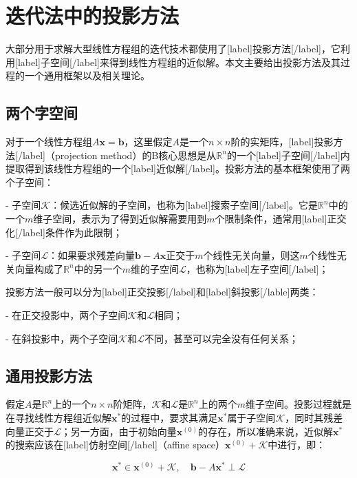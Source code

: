 \documentclass[UTF8,nofonts]{ctexart}
\begin{document}
\section*{迭代法中的投影方法}

大部分用于求解大型线性方程组的迭代技术都使用了[label]投影方法[/label]，它利用[label]子空间[/label]来得到线性方程组的近似解。本文主要给出投影方法及其过程的一个通用框架以及相关理论。

\subsection*{两个字空间}

对于一个线性方程组$A\boldsymbol{x}=\boldsymbol{b}$，这里假定$A$是一个$n \times n$阶的实矩阵，[label]投影方法[/label]（projection method）的B核心思想是从$\mathbb{R}^n$的一个[label]子空间[/label]内提取得到该线性方程组的一个[label]近似解[/label]。投影方法的基本框架使用了两个子空间：

- 子空间$\mathcal{K}$：候选近似解的子空间，也称为[label]搜索子空间[/label]。它是$\mathbb{R}^n$中的一个$m$维子空间，表示为了得到近似解需要用到$m$个限制条件，通常用[label]正交化[/label]条件作为此限制；

- 子空间$\mathcal{L}$：如果要求残差向量$\boldsymbol{b}-A\boldsymbol{x}$正交于$m$个线性无关向量，则这$m$个线性无关向量构成了$\mathbb{R}^n$中的另一个$m$维的子空间$\mathcal{L}$，也称为[label]左子空间[/label]；

投影方法一般可以分为[label]正交投影[/label]和[label]斜投影[/lable]两类：

- 在正交投影中，两个子空间$\mathcal{K}$和$\mathcal{L}$相同；

- 在斜投影中，两个子空间$\mathcal{K}$和$\mathcal{L}$不同，甚至可以完全没有任何关系；

\subsection*{通用投影方法}

假定$A$是$\mathbb{R}^n$上的一个$n \times n$阶矩阵，$\mathcal{K}$和$\mathcal{L}$是$\mathbb{R}^n$上的两个$m$维子空间。投影过程就是在寻找线性方程组近似解$\boldsymbol{x}^\ast$的过程中，要求其满足$\boldsymbol{x}^\ast$属于子空间$\mathcal{K}$，同时其残差向量正交于$\mathcal{L}$；另一方面，由于初始向量$\boldsymbol{x}^{(0)}$的存在，所以准确来说，近似解$\boldsymbol{x}^\ast$的搜索应该在[label]仿射空间[/label]（affine space）$\boldsymbol{x}^{(0)}+\mathcal{K}$中进行，即：

\begin{equation}
\label{eq:mkl}
\boldsymbol{x}^\ast\in\boldsymbol{x}^{(0)}+\mathcal{K},\quad\boldsymbol{b}-A\boldsymbol{x}^\ast\perp\mathcal{L}
\end{equation}
\end{document}
